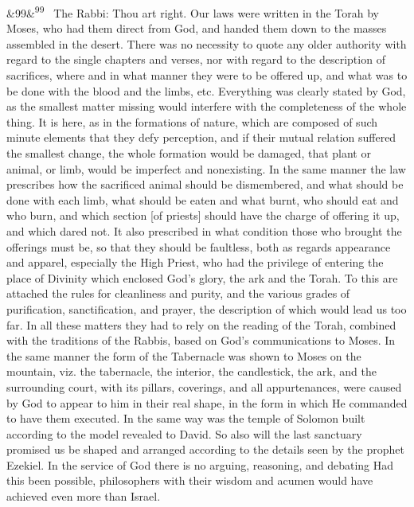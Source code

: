 \documentclass[12pt]{article}
\newcommand{\para}[1][]{\par\noindent\ifx&#1&\else\textsuperscript{\footnotesize #1}~\fi}
\begin{document}
\para[99] The Rabbi: Thou art right. Our laws were written in the Torah by Moses, who had them direct from God, and handed them down to the masses assembled in the desert. There was no necessity to quote any older authority with regard to the single chapters and verses, nor with regard to the description of sacrifices, where and in what manner they were to be offered up, and what was to be done with the blood and the limbs, etc. Everything was clearly stated by God, as the smallest matter missing would interfere with the completeness of the whole thing. It is here, as in the formations of nature, which are composed of such minute elements that they defy perception, and if their mutual relation suffered the smallest change, the whole formation would be damaged, that plant or animal, or limb, would be imperfect and nonexisting. In the same manner the law prescribes how the sacrificed animal should be dismembered, and what should be done with each limb, what should be eaten and what burnt, who should eat and who burn, and which section [of priests] should have the charge of offering it up, and which dared not. It also prescribed in what condition those who brought the offerings must be, so that they should be faultless, both as regards appearance and apparel, especially the High Priest, who had the privilege of entering the place of Divinity which enclosed God's glory, the ark and the Torah. To this are attached the rules for cleanliness and purity, and the various grades of purification, sanctification, and prayer, the description of which would lead us too far. In all these matters they had to rely on the reading of the Torah, combined with the traditions of the Rabbis, based on God's communications to Moses. In the same manner the form of the Tabernacle was shown to Moses on the mountain, viz. the tabernacle, the interior, the candlestick, the ark, and the surrounding court, with its pillars, coverings, and all appurtenances, were caused by God to appear to him in their real shape, in the form in which He commanded to have them executed. In the same way was the temple of Solomon built according to the model revealed to David. So also will the last sanctuary promised us be shaped and arranged according to the details seen by the prophet Ezekiel. In the service of God there is no arguing, reasoning, and debating Had this been possible, philosophers with their wisdom and acumen would have achieved even more than Israel.
\end{document}
